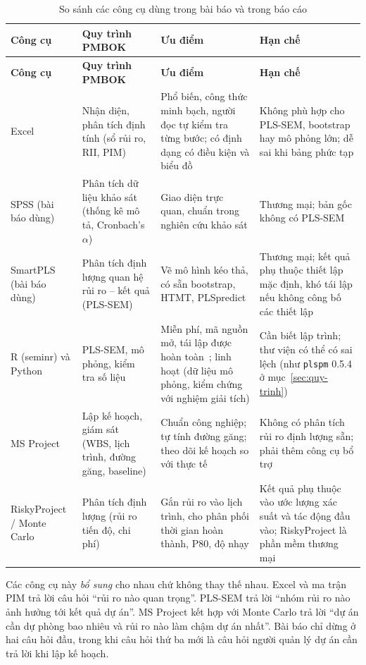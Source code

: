 {\small
\begin{longtable}{@{}L{2.3cm}L{2.9cm}L{4.3cm}L{4.3cm}@{}}
\caption{So sánh các công cụ dùng trong bài báo và trong báo cáo}
\label{tab:cong-cu}\\
\toprule
\textbf{Công cụ} & \textbf{Quy trình PMBOK} & \textbf{Ưu điểm} & \textbf{Hạn chế} \\
\midrule
\endfirsthead
\toprule
\textbf{Công cụ} & \textbf{Quy trình PMBOK} & \textbf{Ưu điểm} & \textbf{Hạn chế} \\
\midrule
\endhead
Excel & Nhận diện, phân tích định tính (sổ rủi ro, RII, PIM) & Phổ biến, công thức minh bạch, người đọc tự kiểm tra từng bước; có định dạng có điều kiện và biểu đồ & Không phù hợp cho PLS-SEM, bootstrap hay mô phỏng lớn; dễ sai khi bảng phức tạp \\
SPSS (bài báo dùng) & Phân tích dữ liệu khảo sát (thống kê mô tả, Cronbach's $\alpha$) & Giao diện trực quan, chuẩn trong nghiên cứu khảo sát & Thương mại; bản gốc không có PLS-SEM \\
SmartPLS (bài báo dùng) & Phân tích định lượng quan hệ rủi ro -- kết quả (PLS-SEM) & Vẽ mô hình kéo thả, có sẵn bootstrap, HTMT, PLSpredict & Thương mại; kết quả phụ thuộc thiết lập mặc định, khó tái lập nếu không công bố các thiết lập \\
R (seminr) và Python & PLS-SEM, mô phỏng, kiểm tra số liệu & Miễn phí, mã nguồn mở, tái lập được hoàn toàn~\cite{hair2021workbook}; linh hoạt (dữ liệu mô phỏng, kiểm chứng với nghiệm giải tích) & Cần biết lập trình; thư viện có thể có sai lệch (như \texttt{plspm} 0.5.4 ở mục~\ref{sec:quy-trinh}) \\
MS Project & Lập kế hoạch, giám sát (WBS, lịch trình, đường găng, baseline) & Chuẩn công nghiệp; tự tính đường găng; theo dõi kế hoạch so với thực tế & Không có phân tích rủi ro định lượng sẵn; phải thêm công cụ bổ trợ \\
RiskyProject / Monte Carlo & Phân tích định lượng (rủi ro tiến độ, chi phí) & Gắn rủi ro vào lịch trình, cho phân phối thời gian hoàn thành, P80, độ nhạy & Kết quả phụ thuộc vào ước lượng xác suất và tác động đầu vào; RiskyProject là phần mềm thương mại \\
\bottomrule
\end{longtable}
}

Các công cụ này \emph{bổ sung} cho nhau chứ không thay thế nhau. Excel và ma trận PIM trả lời câu hỏi ``rủi ro nào quan trọng''. PLS-SEM trả lời ``nhóm rủi ro nào ảnh hưởng tới kết quả dự án''. MS Project kết hợp với Monte Carlo trả lời ``dự án cần dự phòng bao nhiêu và rủi ro nào làm chậm dự án nhất''. Bài báo chỉ dừng ở hai câu hỏi đầu, trong khi câu hỏi thứ ba mới là câu hỏi người quản lý dự án cần trả lời khi lập kế hoạch.

